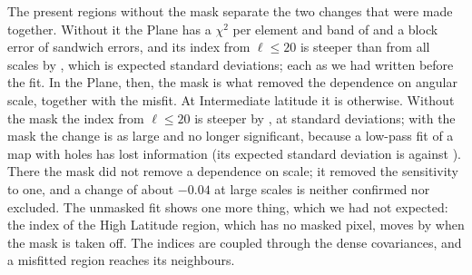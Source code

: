 The present regions without the mask separate the two changes that were made together. Without it
the Plane has a $\chi^2$ per element and band of  and a block error of
 sandwich errors, and its index from $\ell \le 20$ is steeper than from all
scales by , which is  expected standard
deviations; each as we had written before the fit. In the Plane, then, the mask is what removed the
dependence on angular scale, together with the misfit. At Intermediate latitude it is otherwise.
Without the mask the index from $\ell \le 20$ is steeper by , at
 standard deviations; with the mask the change is as large and no longer
significant, because a low-pass fit of a map with holes has lost information (its expected standard
deviation is  against ). There the mask did not remove a
dependence on scale; it removed the sensitivity to one, and a change of about $-0.04$ at large scales
is neither confirmed nor excluded. The unmasked fit shows one more thing, which we had not
expected: the index of the High Latitude region, which has no masked pixel, moves by
 when the mask is taken off. The indices are coupled through the dense covariances,
and a misfitted region reaches its neighbours.

